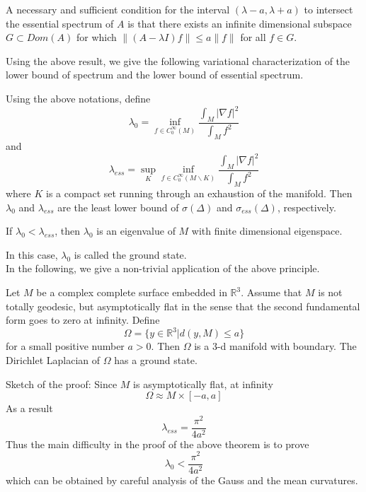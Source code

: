 \begin{theorem}
A necessary and sufficient condition for the interval $(\lambda-a,\lambda+a)$
to intersect the essential spectrum of $A$ is that there exists an infinite
dimensional subspace $G\subset Dom(A)$ for which 
$\|(A-\lambda I)f\|\leqslant a \|f\|$ for all $f\in G$.
\end{theorem}

Using the above result, we give the following variational characterization of
the lower bound of spectrum and the lower bound of essential spectrum.

\begin{theorem}
Using the above notations, define
\[
\lambda_0 = \inf_{f\in C_0^\infty(M)}\frac{\int_M |\nabla f|^2}{\int_M f^2}
\]
and
\[
\lambda_{ess} = \sup_K \inf_{f\in C_0^\infty(M\backslash K)}\frac{\int_M |\nabla f|^2}{\int_M f^2}
\]
where $K$ is a compact set running through an exhaustion of the manifold. Then
$\lambda_0$ and $\lambda_{ess}$ are the least lower bound of $\sigma(\Delta)$
and $\sigma_{ess}(\Delta)$, respectively.
\end{theorem}

\begin{corollary}
If $\lambda_0 < \lambda_{ess}$, then $\lambda_0$ is an eigenvalue of $M$ with
finite dimensional eigenspace.
\end{corollary}

In this case, $\lambda_0$ is called the ground state.
\\

In the following, we give a non-trivial application of the above principle.

\begin{theorem}
[Lin-Lu] Let $M$ be a complex complete surface embedded in $\mathbb{R}^3$.
Assume that $M$ is not totally geodesic, but asymptotically flat in the sense
that the second fundamental form goes to zero at infinity. Define
\[
\Omega = \{y\in\mathbb{R}^3 | d(y,M) \leqslant a \}
\]
for a small positive number $a > 0$. Then $\Omega$ is a $3$-d manifold with
boundary. The Dirichlet Laplacian of $\Omega$ has a ground state.
\end{theorem}

Sketch of the proof: Since $M$ is asymptotically flat, at infinity
\[
\Omega \approx M \times [-a, a]
\]
As a result
\[
\lambda_{ess} = \frac{\pi^2}{4a^2}
\]
Thus the main difficulty in the proof of the above theorem is to prove
\[
\lambda_0 < \frac{\pi^2}{4a^2}
\]
which can be obtained by careful analysis of the Gauss and the mean curvatures.

